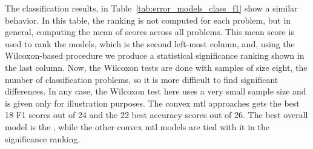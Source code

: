 The classification results, in Table~\ref{tab:error_models_class_f1} show a similar behavior. In this table, the ranking is not computed for each problem, but in general, computing the mean of scores across all problems. This mean score is used to rank the models, which is the second left-most column, and, using the Wilcoxon-based procedure we produce a statistical significance ranking shown in the last column. Now, the Wilcoxon tests are done with samples of size eight, the number of classification problems, so it is more difficult to find significant differences. In any case, the Wilcoxon test here uses a very small sample size and is given only for illustration purposes.
The convex \acrshort{mtl} approaches gets the best 18 F1 scores out of 24 and the 22 best accuracy scores out of 26. The best overall model is the , while the other convex \acrshort{mtl} models are tied with it in the significance ranking.

















































































































